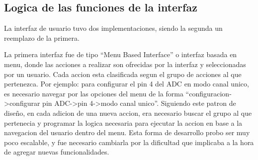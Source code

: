 

\subsection{Logica de las funciones de la interfaz} %
\label{it2:sub:logica_de_las_funciones_de_la_interfaz}


La interfaz de usuario tuvo dos implementaciones, siendo la segunda un reemplazo de la primera.

La primera interfaz fue de tipo ``Menu Based Interface'' o interfaz basada en menu, donde las acciones a realizar son ofrecidas por la interfaz y seleccionadas por un usuario. Cada accion esta clasificada segun el grupo de acciones al que pertenezca. Por ejemplo: para configurar el pin 4 del ADC en modo canal unico, es necesario navegar por las opciones del menu de la forma ``configuracion->configurar pin ADC->pin 4->modo canal unico''. Siguiendo este patron de diseño, en cada adicion de una nueva accion, era necesario buscar el grupo al que pertenecia y programar la logica necesaria para ejecutar la accion en base a la navegacion del usuario dentro del menu. Esta forma de desarrollo probo ser muy poco escalable, y fue necesario cambiarla por la dificultad que implicaba a la hora de agregar nuevas funcionalidades. \\

